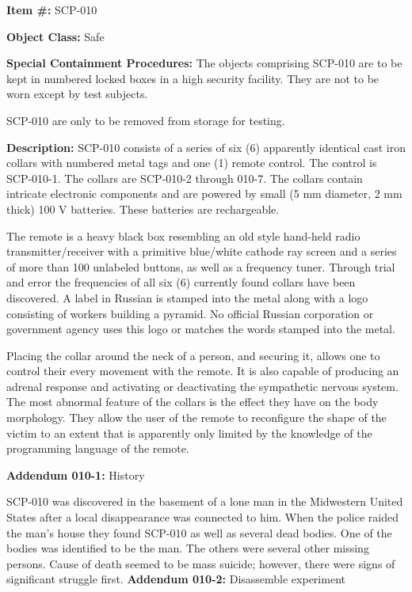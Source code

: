 \textbf{Item \#:} SCP-010

\textbf{Object Class:} Safe

\textbf{Special Containment Procedures:} The objects comprising SCP-010 are to be kept in numbered locked boxes in a high security facility. They are not to be worn except by test subjects.

SCP-010 are only to be removed from storage for testing.

\textbf{Description:} SCP-010 consists of a series of six (6) apparently identical cast iron collars with numbered metal tags and one (1) remote control. The control is SCP-010-1. The collars are SCP-010-2 through 010-7. The collars contain intricate electronic components and are powered by small (5 mm diameter, 2 mm thick) 100 V batteries. These batteries are rechargeable.

The remote is a heavy black box resembling an old style hand-held radio transmitter/receiver with a primitive blue/white cathode ray screen and a series of more than 100 unlabeled buttons, as well as a frequency tuner. Through trial and error the frequencies of all six (6) currently found collars have been discovered. A label in Russian is stamped into the metal along with a logo consisting of workers building a pyramid. No official Russian corporation or government agency uses this logo or matches the words stamped into the metal.

Placing the collar around the neck of a person, and securing it, allows one to control their every movement with the remote. It is also capable of producing an adrenal response and activating or deactivating the sympathetic nervous system. The most abnormal feature of the collars is the effect they have on the body morphology. They allow the user of the remote to reconfigure the shape of the victim to an extent that is apparently only limited by the knowledge of the programming language of the remote.

\textbf{Addendum 010-1:} History

SCP-010 was discovered in the basement of a lone man in the Midwestern United States after a local disappearance was connected to him. When the police raided the man's house they found SCP-010 as well as several dead bodies. One of the bodies was identified to be the man. The others were several other missing persons. Cause of death seemed to be mass suicide; however, there were signs of significant struggle first.
\newpage
\textbf{Addendum 010-2:} Disassemble experiment


